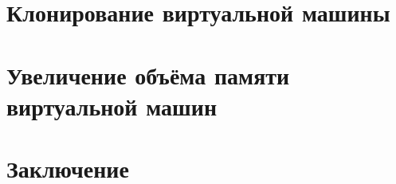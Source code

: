 \documentclass[oneside,final,12pt]{extarticle} %
\begin{document}
\section{Клонирование виртуальной машины}

\newpage

\section{Увеличение объёма памяти виртуальной машин}

\newpage

\section*{Заключение}
\newpage

\begin{thebibliography}[]

\end{thebibliography}
\newpage
\appendix
\end{document}
